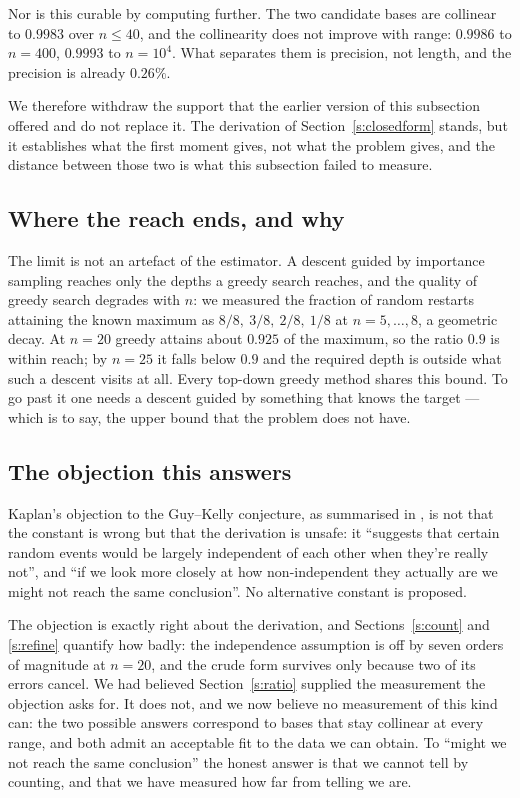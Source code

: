\documentclass[11pt,a4paper]{article}
\begin{document}
Nor is this curable by computing further.  The two candidate bases are collinear to $0.9983$ over
$n\le40$, and the collinearity does not improve with range: $0.9986$ to $n=400$, $0.9993$ to
$n=10^4$.  What separates them is precision, not length, and the precision is already $0.26\%$.

We therefore withdraw the support that the earlier version of this subsection offered and do not replace it.  The
derivation of Section~\ref{s:closedform} stands, but it establishes what the first moment gives, not what the
problem gives, and the distance between those two is what this subsection failed to measure.

\subsection{Where the reach ends, and why}\label{s:reach}
The limit is not an artefact of the estimator.  A descent guided by importance sampling reaches
only the depths a greedy search reaches, and the quality of greedy search degrades with $n$: we
measured the fraction of random restarts attaining the known maximum as $8/8,\ 3/8,\ 2/8,\ 1/8$
at $n=5,\dots,8$, a geometric decay.  At $n=20$ greedy attains about $0.925$ of the maximum, so
the ratio $0.9$ is within reach; by $n=25$ it falls below $0.9$ and the required depth is outside
what such a descent visits at all.  Every top-down greedy method shares this bound.  To go past it
one needs a descent guided by something that knows the target --- which is to say, the upper bound
that the problem does not have.

\subsection{The objection this answers}\label{s:kaplan}
Kaplan's objection to the Guy--Kelly conjecture, as summarised in \cite{Kaplan}, is not that the
constant is wrong but that the derivation is unsafe: it ``suggests that certain random events would
be largely independent of each other when they're really not'', and ``if we look more closely at
how non-independent they actually are we might not reach the same conclusion''.  No alternative
constant is proposed.

The objection is exactly right about the derivation, and Sections~\ref{s:count} and \ref{s:refine} quantify how badly:
the independence assumption is off by seven orders of magnitude at $n=20$, and the crude form
survives only because two of its errors cancel.  We had believed Section~\ref{s:ratio} supplied the
measurement the objection asks for.  It does not, and we now believe no measurement of this kind
can: the two possible answers correspond to bases that stay collinear at every range, and both
admit an acceptable fit to the data we can obtain.  To ``might we not reach the same conclusion''
the honest answer is that we cannot tell by counting, and that we have measured how far from
telling we are.
\end{document}
